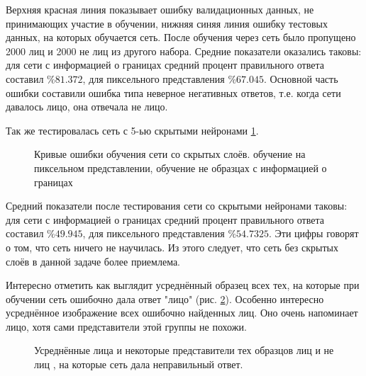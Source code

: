 \documentclass[12pt]{report}
\begin{document}
Верхняя красная линия показывает ошибку валидационных данных, не принимающих участие в обучении, нижняя синяя линия 
ошибку тестовых данных, на которых обучается сеть. После обучения через сеть было пропущено 2000 лиц и 2000 не лиц 
из 
другого набора. Средние показатели оказались таковы: для сети с информацией о границах средний процент правильного 
ответа составил $\%81.372$, для пиксельного представления $\%67.045$. Основной часть ошибки составили ошибка типа 
неверное негативных ответов, т.е. когда сети давалось лицо, она отвечала не лицо.

Так же тестировалась сеть с 5-ью скрытыми нейронами \ref{fig:ann_hidd_chart}.
\begin{figure}[h]
	\centering
	\caption{Кривые ошибки обучения сети со скрытых слоёв.  обучение на пиксельном 
представлении, 
 обучение не образцах с информацией о границах}
	\label{fig:ann_hidd_chart}
\end{figure}

Средний показатели после тестирования сети со скрытыми нейронами таковы: для сети с информацией о границах средний 
процент правильного ответа составил $\%49.945$, для пиксельного представления $\%54.7325$. Эти цифры говорят о том, 
что сеть ничего не научилась. Из этого следует, что сеть без скрытых слоёв в данной задаче более приемлема.

Интересно отметить как выглядит усреднённый образец всех тех, на которые при обучении сеть ошибочно дала ответ 
"лицо" (рис. \ref{fig:false_avg}). Особенно интересно усреднённое изображение всех ошибочно найденных лиц. Оно 
очень 
напоминает лицо, хотя сами представители этой группы не похожи. 

\begin{figure}[h]
	\centering
	\hspace{1cm}
	\caption{Усреднённые лица и некоторые представители тех образцов лиц  и не лиц 
, на которые сеть дала неправильный ответ.}
	\label{fig:false_avg}
\end{figure}
\end{document}
